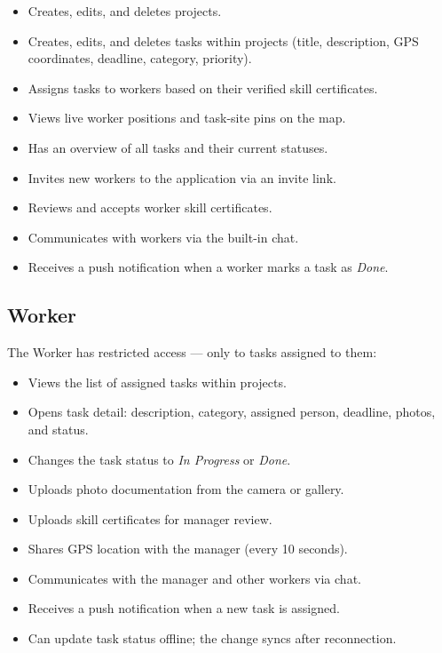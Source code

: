 \documentclass[12pt,a4paper]{article}
\begin{document}
\begin{itemize}[noitemsep]
    \item Creates, edits, and deletes projects.
    \item Creates, edits, and deletes tasks within projects (title, description, GPS coordinates, deadline, category, priority).
    \item Assigns tasks to workers based on their verified skill certificates.
    \item Views live worker positions and task-site pins on the map.
    \item Has an overview of all tasks and their current statuses.
    \item Invites new workers to the application via an invite link.
    \item Reviews and accepts worker skill certificates.
    \item Communicates with workers via the built-in chat.
    \item Receives a push notification when a worker marks a task as \textit{Done}.
\end{itemize}

\subsection{Worker}

The Worker has restricted access --- only to tasks assigned to them:

\begin{itemize}[noitemsep]
    \item Views the list of assigned tasks within projects.
    \item Opens task detail: description, category, assigned person, deadline, photos, and status.
    \item Changes the task status to \textit{In Progress} or \textit{Done}.
    \item Uploads photo documentation from the camera or gallery.
    \item Uploads skill certificates for manager review.
    \item Shares GPS location with the manager (every 10 seconds).
    \item Communicates with the manager and other workers via chat.
    \item Receives a push notification when a new task is assigned.
    \item Can update task status offline; the change syncs after reconnection.
\end{itemize}
\end{document}
